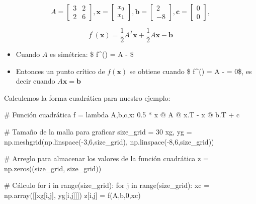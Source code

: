 \documentclass[
  letterpaper,
  DIV=11,
  numbers=noendperiod]{scrreprt}
\newenvironment{Shaded}{\begin{snugshade}}{\end{snugshade}}
\newcommand{\BuiltInTok}[1]{\textcolor[rgb]{0.00,0.23,0.31}{#1}}
\newcommand{\CommentTok}[1]{\textcolor[rgb]{0.37,0.37,0.37}{#1}}
\newcommand{\ControlFlowTok}[1]{\textcolor[rgb]{0.00,0.23,0.31}{#1}}
\newcommand{\DecValTok}[1]{\textcolor[rgb]{0.68,0.00,0.00}{#1}}
\newcommand{\FloatTok}[1]{\textcolor[rgb]{0.68,0.00,0.00}{#1}}
\newcommand{\KeywordTok}[1]{\textcolor[rgb]{0.00,0.23,0.31}{#1}}
\newcommand{\NormalTok}[1]{\textcolor[rgb]{0.00,0.23,0.31}{#1}}
\newcommand{\OperatorTok}[1]{\textcolor[rgb]{0.37,0.37,0.37}{#1}}
\providecommand{\tightlist}{%
  \setlength{\itemsep}{0pt}\setlength{\parskip}{0pt}}\usepackage{longtable,booktabs,array}
\begin{document}
\[
A =
\left[
\begin{array}{cc}
3 & 2 \\
2 & 6
\end{array} \right],
\mathbf{x} =
\left[
\begin{array}{c}
x_{0} \\
x_{1}
\end{array} \right],
\mathbf{b} =
\left[
\begin{array}{c}
2\\ -8
\end{array}
\right], 
\mathbf{c} =
\left[
\begin{array}{c}
0\\ 0
\end{array}
\right], 
\]

\[ f^\prime(\mathbf{x}) = \dfrac{1}{2} A^T \mathbf{x} + \dfrac{1}{2} A \mathbf{x} - \mathbf{b} \]

\begin{itemize}
\tightlist
\item
  Cuando \(A\) es simétrica: \$ f\^{}\prime() = A  -
   \$
\item
  Entonces un punto crítico de \(f(\mathbf{x})\) se obtiene cuando \$
  f\^{}\prime() = A  -  = 0\$, es decir
  cuando \(A \mathbf{x} = \mathbf{b}\)
\end{itemize}

Calculemos la forma cuadrática para nuestro ejemplo:

\begin{Shaded}
\begin{Highlighting}[]
\CommentTok{\# Función cuadrática}
\NormalTok{f }\OperatorTok{=} \KeywordTok{lambda}\NormalTok{ A,b,c,x: }\FloatTok{0.5} \OperatorTok{*}\NormalTok{ x }\OperatorTok{@}\NormalTok{ A }\OperatorTok{@}\NormalTok{ x.T }\OperatorTok{{-}}\NormalTok{ x }\OperatorTok{@}\NormalTok{ b.T }\OperatorTok{+}\NormalTok{ c}

\CommentTok{\# Tamaño de la malla para graficar}
\NormalTok{size\_grid }\OperatorTok{=} \DecValTok{30}
\NormalTok{xg, yg }\OperatorTok{=}\NormalTok{ np.meshgrid(np.linspace(}\OperatorTok{{-}}\DecValTok{3}\NormalTok{,}\DecValTok{6}\NormalTok{,size\_grid),}
\NormalTok{                     np.linspace(}\OperatorTok{{-}}\DecValTok{8}\NormalTok{,}\DecValTok{6}\NormalTok{,size\_grid))}

\CommentTok{\# Arreglo para almacenar los valores de la función cuadrática}
\NormalTok{z }\OperatorTok{=}\NormalTok{ np.zeros((size\_grid, size\_grid))}

\CommentTok{\# Cálculo}
\ControlFlowTok{for}\NormalTok{ i }\KeywordTok{in} \BuiltInTok{range}\NormalTok{(size\_grid):}
    \ControlFlowTok{for}\NormalTok{ j }\KeywordTok{in} \BuiltInTok{range}\NormalTok{(size\_grid):}
\NormalTok{        xc }\OperatorTok{=}\NormalTok{ np.array([[xg[i,j], yg[i,j]]])}
\NormalTok{        z[i,j] }\OperatorTok{=}\NormalTok{ f(A,b,}\DecValTok{0}\NormalTok{,xc)}
\end{Highlighting}
\end{Shaded}
\end{document}

